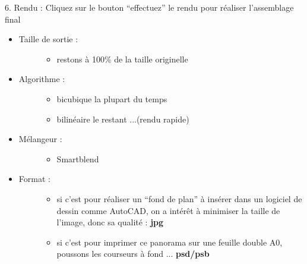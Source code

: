 \documentclass[a4paper,12pt,french]{sphinxmanual}
\begin{document}
6. Rendu :
Cliquez sur le bouton ``effectuez'' le rendu pour réaliser l'assemblage final
\begin{itemize}
\item {} \begin{description}
\item[{Taille de sortie :}] \leavevmode\begin{itemize}
\item {} 
restons à 100\% de la taille originelle

\end{itemize}

\end{description}

\item {} \begin{description}
\item[{Algorithme :}] \leavevmode\begin{itemize}
\item {} 
bicubique la plupart du temps

\item {} 
bilinéaire le restant ...(rendu rapide)

\end{itemize}

\end{description}

\item {} \begin{description}
\item[{Mélangeur :}] \leavevmode\begin{itemize}
\item {} 
Smartblend

\end{itemize}

\end{description}

\item {} \begin{description}
\item[{Format :}] \leavevmode\begin{itemize}
\item {} 
si c'est pour réaliser un ``fond de plan'' à insérer dans un logiciel de dessin comme AutoCAD, on a intérêt à minimiser la taille de l'image, donc sa qualité : \textbf{jpg}

\item {} 
si c'est pour imprimer ce panorama sur une feuille double A0, poussons les courseurs à fond ... \textbf{psd/psb}

\end{itemize}

\end{description}

\end{itemize}
\end{document}
